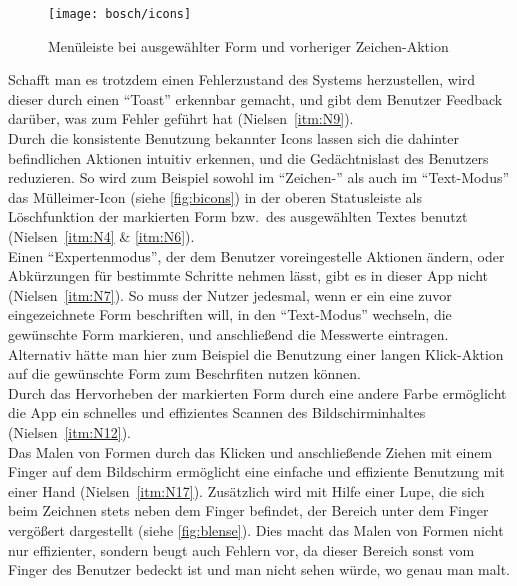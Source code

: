 \begin{figure}[h]
  \centering
  \texttt{[image: bosch/icons]}
  \caption{Menüleiste bei ausgewählter Form und vorheriger Zeichen-Aktion}
  \label{fig:bicons}
\end{figure}

Schafft man es trotzdem einen Fehlerzustand des Systems herzustellen, wird dieser durch einen ``Toast''  erkennbar gemacht, und gibt dem Benutzer Feedback darüber, was zum Fehler geführt hat  (Nielsen~\autoref{itm:N9}). \\

Durch die konsistente Benutzung bekannter Icons lassen sich die dahinter befindlichen Aktionen intuitiv erkennen, und die Gedächtnislast des Benutzers reduzieren. 
So wird zum Beispiel sowohl im ``Zeichen-'' als auch im ``Text-Modus'' das Mülleimer-Icon (siehe \autoref{fig:bicons}) in der oberen Statusleiste als Löschfunktion der markierten Form bzw.\ des ausgewählten Textes benutzt (Nielsen~\autoref{itm:N4} \& \autoref{itm:N6}). \\

Einen ``Expertenmodus'', der dem Benutzer voreingestelle Aktionen ändern, oder Abkürzungen für bestimmte Schritte nehmen lässt, gibt es in dieser App nicht (Nielsen~\autoref{itm:N7}).
So muss der Nutzer jedesmal, wenn er ein eine zuvor eingezeichnete Form beschriften will, in den ``Text-Modus'' wechseln, die gewünschte Form markieren, und anschließend die Messwerte eintragen. 
Alternativ hätte man hier zum Beispiel die Benutzung einer langen Klick-Aktion auf die gewünschte Form zum Beschrfiten nutzen können. \\

Durch das Hervorheben der markierten Form durch eine andere Farbe ermöglicht die App ein schnelles und effizientes Scannen des Bildschirminhaltes (Nielsen~\autoref{itm:N12}). \\

Das Malen von Formen durch das Klicken und anschließende Ziehen mit einem Finger auf dem Bildschirm ermöglicht eine einfache und effiziente Benutzung mit einer Hand (Nielsen~\autoref{itm:N17}).
Zusätzlich wird mit Hilfe einer Lupe, die sich beim Zeichnen stets neben dem Finger befindet, der Bereich unter dem Finger vergößert dargestellt (siehe \autoref{fig:blense}).
Dies macht das Malen von Formen nicht nur effizienter, sondern beugt auch Fehlern vor, da dieser Bereich sonst vom Finger des Benutzer bedeckt ist und man nicht sehen würde, wo genau man malt. \\

